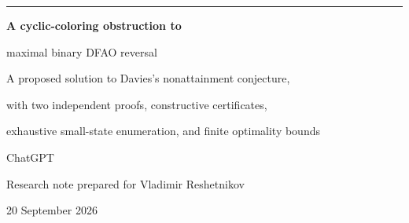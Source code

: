 \documentclass[11pt,a4paper]{article}
\numberwithin{equation}{section}
\theoremstyle{definition}
\theoremstyle{remark}
\begin{document}
\begin{titlepage}
\vspace*{12mm}
{\color{Olive}\rule{\textwidth}{1.2pt}}\par
\vspace{7mm}
{\LARGE\bfseries A cyclic-coloring obstruction to\par
maximal binary DFAO reversal\par}
\vspace{6mm}
{\large A proposed solution to Davies's nonattainment conjecture,\par
with two independent proofs, constructive certificates,\par
exhaustive small-state enumeration, and finite optimality bounds\par}
\vspace{10mm}
{\large ChatGPT}\par
{Research note prepared for Vladimir Reshetnikov}\par
{20 September 2026}
\vspace{10mm}
\begin{abstract}
An $n$-state deterministic finite automaton with $k$ output values admits a
reversal construction with $k^n$ states. We investigate whether this bound can
be attained with only two input letters when $3\le k\le n$. We give a
self-contained proposed proof that it cannot. More precisely, for arbitrary
transformations $a,b$ of an $n$-element set and arbitrary $k$-valued output map
$\tau$, we prove
\[
 |\tau\langle a,b\rangle|\le k^n-k!+g(k)<k^n,
\]
where $g(k)$ is the maximum order of a permutation of $k$ objects.
The central construction is the graph formed by translating one collision
pair under a permutation. This graph is always $3$-colorable. Its proper
colorings can only be reached through permutation powers, whereas three
suitable output relabelings cannot lie in a single cyclic orbit.

Two independent proofs of nonattainment are given: a short qualitative one,
which uses no counting and no Landau function, and the quantitative one that
yields the displayed additive deficit. We also give a polynomial-time
algorithm producing an explicit missing coloring together with two
independently checkable certificate formats, extend the obstruction to an
abelian group of permutation letters and one singular letter, and derive two
sharper upper bounds from chromatic polynomials: an instance-specific one
that is exact for the worked examples, and a weaker one that abstracts into a
universal structural bound. A complete C++ enumeration settles all
$462\,066$ reduced instances with $n\le4$, and exact arithmetic verifies
agreement with Davies's proposed binary optimum for all $372$ pairs
$7\le n\le30$, $3\le k<n$. This finite optimality statement is distinct from
the unrestricted theorem. Source, verification programs, explicit automata,
certificates, and numerical records accompany the article.
\end{abstract}


\end{titlepage}
\end{document}
